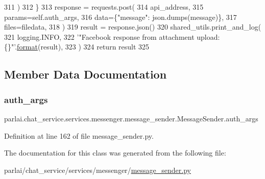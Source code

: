\begin{DoxyCode}
311                     )
312                 \}
313                 response = requests.post(
314                     api\_address,
315                     params=self.auth\_args,
316                     data=\{\textcolor{stringliteral}{"message"}: json.dumps(message)\},
317                     files=filedata,
318                 )
319         result = response.json()
320         shared\_utils.print\_and\_log(
321             logging.INFO,
322             \textcolor{stringliteral}{'"Facebook response from attachment upload: \{\}"'}.\hyperlink{namespaceparlai_1_1chat__service_1_1services_1_1messenger_1_1shared__utils_a32e2e2022b824fbaf80c747160b52a76}{format}(result),
323         )
324         \textcolor{keywordflow}{return} result
325 \end{DoxyCode}


\subsection{Member Data Documentation}
\mbox{\label{classparlai_1_1chat__service_1_1services_1_1messenger_1_1message__sender_1_1MessageSender_a748eb4858eed560aba381963050ad4b1}} 
\subsubsection{\texorpdfstring{auth\+\_\+args}{auth\_args}}
{\footnotesize\ttfamily parlai.\+chat\+\_\+service.\+services.\+messenger.\+message\+\_\+sender.\+Message\+Sender.\+auth\+\_\+args}



Definition at line 162 of file message\+\_\+sender.\+py.



The documentation for this class was generated from the following file\+:\begin{DoxyCompactItemize}
\item 
parlai/chat\+\_\+service/services/messenger/\hyperlink{message__sender_8py}{message\+\_\+sender.\+py}\end{DoxyCompactItemize}
